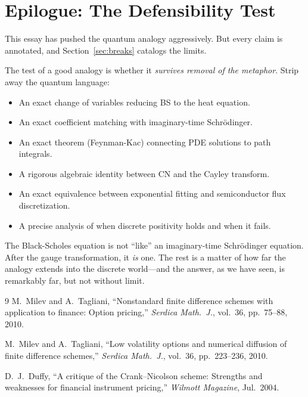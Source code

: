 \section{Epilogue: The Defensibility Test}
\label{sec:epilogue}

This essay has pushed the quantum analogy aggressively.  But every claim is annotated, and Section~\ref{sec:breaks} catalogs the limits.

The test of a good analogy is whether it \emph{survives removal of the metaphor}.  Strip away the quantum language:
\begin{itemize}
  \item An exact change of variables reducing BS to the heat equation.
  \item An exact coefficient matching with imaginary-time Schr\"{o}dinger.
  \item An exact theorem (Feynman-Kac) connecting PDE solutions to path integrals.
  \item A rigorous algebraic identity between CN and the Cayley transform.
  \item An exact equivalence between exponential fitting and semiconductor flux discretization.
  \item A precise analysis of when discrete positivity holds and when it fails.
\end{itemize}

The Black-Scholes equation is not ``like'' an imaginary-time Schr\"{o}dinger equation.  After the gauge transformation, it \emph{is} one.  The rest is a matter of how far the analogy extends into the discrete world---and the answer, as we have seen, is remarkably far, but not without limit.

\begin{thebibliography}{9}
M.~Milev and A.~Tagliani, ``Nonstandard finite difference schemes with application to finance: Option pricing,'' \emph{Serdica Math.\ J.}, vol.~36, pp.~75--88, 2010.

M.~Milev and A.~Tagliani, ``Low volatility options and numerical diffusion of finite difference schemes,'' \emph{Serdica Math.\ J.}, vol.~36, pp.~223--236, 2010.

D.~J.~Duffy, ``A critique of the Crank--Nicolson scheme: Strengths and weaknesses for financial instrument pricing,'' \emph{Wilmott Magazine}, Jul.~2004.
\end{thebibliography}

